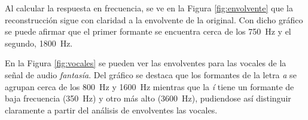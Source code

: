 
	Al calcular la respuesta en frecuencia, se ve en la Figura \ref{fig:envolvente} que la reconstrucción sigue con claridad a la envolvente de la original. Con dicho gráfico se puede afirmar que el primer formante se encuentra cerca de los \SI{750}{\Hz} y el segundo, \SI{1800}{\Hz}.
	

	\pagebreak
	En la Figura \ref{fig:vocales} se pueden ver las envolventes para las vocales de la señal de audio \emph{fantasía}. Del gráfico se destaca que los formantes de la letra \emph{a} se agrupan cerca de los \SI{800}{\Hz} y \SI{1600}{\Hz} mientras que la \emph{í} tiene un formante de baja frecuencia (\SI{350}{\Hz}) y otro más alto (\SI{3600}{\Hz}), pudiendose así distinguir claramente a partir del análisis de envolventes las vocales.
